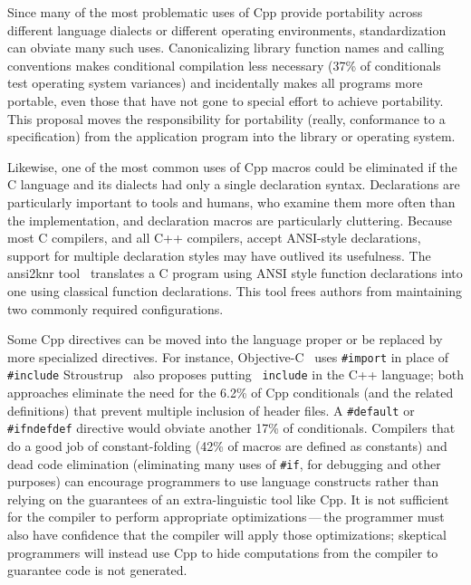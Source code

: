 \documentclass[10pt]{article}
\begin{document}
Since many of the most problematic uses of Cpp provide portability across
different language dialects or different operating environments,
standardization can obviate many such uses.  Canonicalizing library
function names and calling conventions makes conditional compilation less
necessary (37\% of conditionals test operating system variances) and
incidentally makes all programs more portable, even those that have not
gone to special effort to achieve portability.  This proposal moves the
responsibility for portability (really, conformance to a specification)
from the application program into the library or operating system.

Likewise, one of the most common uses of Cpp macros could be eliminated if
the C language and its dialects had only a single declaration syntax.
Declarations are particularly important to tools and humans, who examine
them more often than the implementation, and declaration macros are
particularly cluttering.
Because most C compilers, and all C++ compilers, accept ANSI-style
declarations, support for multiple declaration styles may have outlived its
usefulness.  The ansi2knr tool~\cite{Deutsch90} translates a C program
using ANSI style function declarations into one using classical function
declarations.  This tool frees authors from maintaining two commonly
required configurations.

Some Cpp directives can be moved into the language proper or be replaced by
more specialized directives.  For instance, Objective-C~\cite{CoxN91} uses
{\tt \#import} in place of {\tt \#include}
Stroustrup~\cite{Stroustrup-DesignEvolution} also proposes putting {\tt
include} in the C++ language; both approaches eliminate the need for the
6.2\% of Cpp conditionals (and the related definitions) that prevent
multiple inclusion of header files.  A {\tt \#default} or {\tt \#ifndefdef}
directive would obviate another 17\% of conditionals.  Compilers that do a
good job of constant-folding (42\% of macros are defined as constants) and
dead code elimination (eliminating many uses of {\tt \#if}, for debugging
and other purposes) can encourage programmers to use language constructs
rather than relying on the guarantees of an extra-linguistic tool like Cpp.
It is not sufficient for the compiler to perform appropriate
optimizations\,---\,the programmer must also have confidence that the
compiler will apply those optimizations; skeptical programmers will instead
use Cpp to hide computations from the compiler to guarantee code is not
generated.
\end{document}
